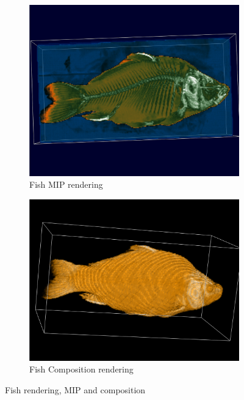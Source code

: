 \documentclass[a4paper,twoside,11pt]{article}
\begin{document}
\begin{figure}[h]
    \begin{center}
        \begin{subfigure}[b]{0.47\textwidth}
            \includegraphics[width=\textwidth]{SanderImages/visMIPZ.png}
            \caption{Fish MIP rendering}
            \label{fig:FishMIP}
        \end{subfigure}
        \begin{subfigure}[b]{0.49\textwidth}
            \includegraphics[width=\textwidth]{SanderImages/FishCompZ.png}
            \caption{Fish Composition rendering}
            \label{fig:FishComp}
        \end{subfigure}
        \caption{Fish rendering, MIP and composition}
    \end{center}
\end{figure} \newline
\end{document}
